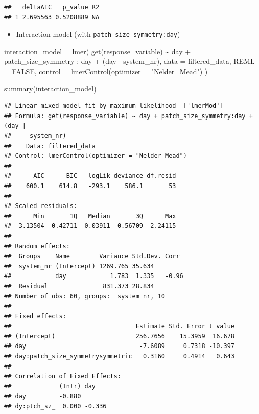 \documentclass[
]{article}
\newenvironment{Shaded}{\begin{snugshade}}{\end{snugshade}}
\newcommand{\AttributeTok}[1]{\textcolor[rgb]{0.77,0.63,0.00}{#1}}
\newcommand{\ConstantTok}[1]{\textcolor[rgb]{0.00,0.00,0.00}{#1}}
\newcommand{\FunctionTok}[1]{\textcolor[rgb]{0.00,0.00,0.00}{#1}}
\newcommand{\NormalTok}[1]{#1}
\newcommand{\OtherTok}[1]{\textcolor[rgb]{0.56,0.35,0.01}{#1}}
\newcommand{\SpecialCharTok}[1]{\textcolor[rgb]{0.00,0.00,0.00}{#1}}
\newcommand{\StringTok}[1]{\textcolor[rgb]{0.31,0.60,0.02}{#1}}
\providecommand{\tightlist}{%
  \setlength{\itemsep}{0pt}\setlength{\parskip}{0pt}}
\begin{document}
\begin{verbatim}
##   deltaAIC   p_value R2
## 1 2.695563 0.5208889 NA
\end{verbatim}

\begin{itemize}
\tightlist
\item
  Interaction model (with \texttt{patch\_size\_symmetry:day})
\end{itemize}

\begin{Shaded}
\begin{Highlighting}[]
\NormalTok{interaction\_model }\OtherTok{=} \FunctionTok{lmer}\NormalTok{(}
  \FunctionTok{get}\NormalTok{(response\_variable) }\SpecialCharTok{\textasciitilde{}}
\NormalTok{    day }\SpecialCharTok{+} 
\NormalTok{    patch\_size\_symmetry }\SpecialCharTok{:}\NormalTok{ day }\SpecialCharTok{+} 
\NormalTok{    (day }\SpecialCharTok{|}\NormalTok{ system\_nr), }
  \AttributeTok{data =}\NormalTok{ filtered\_data,}
  \AttributeTok{REML =} \ConstantTok{FALSE}\NormalTok{,}
  \AttributeTok{control =} \FunctionTok{lmerControl}\NormalTok{(}\AttributeTok{optimizer =} \StringTok{"Nelder\_Mead"}\NormalTok{)}
\NormalTok{)}

\FunctionTok{summary}\NormalTok{(interaction\_model)}
\end{Highlighting}
\end{Shaded}

\begin{verbatim}
## Linear mixed model fit by maximum likelihood  ['lmerMod']
## Formula: get(response_variable) ~ day + patch_size_symmetry:day + (day |  
##     system_nr)
##    Data: filtered_data
## Control: lmerControl(optimizer = "Nelder_Mead")
## 
##      AIC      BIC   logLik deviance df.resid 
##    600.1    614.8   -293.1    586.1       53 
## 
## Scaled residuals: 
##      Min       1Q   Median       3Q      Max 
## -3.13504 -0.42711  0.03911  0.56709  2.24115 
## 
## Random effects:
##  Groups    Name        Variance Std.Dev. Corr 
##  system_nr (Intercept) 1269.765 35.634        
##            day            1.783  1.335   -0.96
##  Residual               831.373 28.834        
## Number of obs: 60, groups:  system_nr, 10
## 
## Fixed effects:
##                                  Estimate Std. Error t value
## (Intercept)                      256.7656    15.3959  16.678
## day                               -7.6089     0.7318 -10.397
## day:patch_size_symmetrysymmetric   0.3160     0.4914   0.643
## 
## Correlation of Fixed Effects:
##             (Intr) day   
## day         -0.880       
## dy:ptch_sz_  0.000 -0.336
\end{verbatim}
\end{document}

